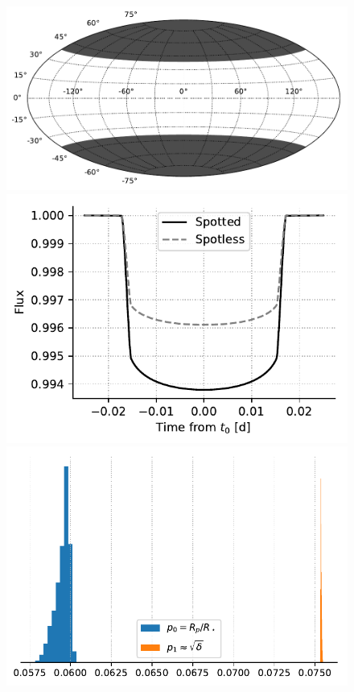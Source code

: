 \begin{subappendices}
\begin{figure}
    \centering
    \includegraphics[scale=0.5]{robin/spot_map_3.pdf}
    \includegraphics[scale=0.6]{robin/transit_quad_3.pdf}
    \includegraphics[scale=0.7]{robin/rms3_agreement.pdf}

\end{figure}
\end{subappendices}
